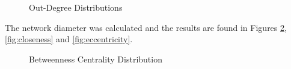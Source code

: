 \begin{figure}[h!]
\centering
{}
\caption{Out-Degree Distributions}
\label{fig:outdegree}
\end{figure}

\clearpage

The network diameter was calculated and the results are found in Figures \ref{fig:between}, \ref{fig:closeness} and \ref{fig:eccentricity}.

\begin{figure}[h!]
\centering
{}
\caption{Betweenness Centrality Distribution}
\label{fig:between}
\end{figure}

